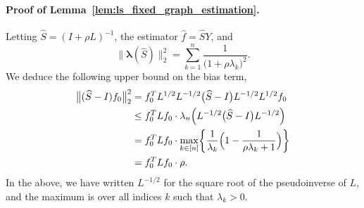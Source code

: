 \documentclass[twoside]{article}
\newcommand{\1}{\mathbf{1}}
\newcommand{\lambdavec}{\boldsymbol{\lambda}}
\newcommand{\Lap}{L}
\newcommand{\Id}{I}
\newcommand{\wh}[1]{\widehat{#1}}
\theoremstyle{definition}
\theoremstyle{remark}
\begin{document}
\paragraph{Proof of Lemma~\ref{lem:ls_fixed_graph_estimation}.}
Letting $\wh{S} = (\Id + \rho \Lap)^{-1}$, the estimator $\wh{f} = \wh{S}Y$, and
\begin{equation*}
\bigl\|\lambdavec(\wh{S})\bigr\|_2^2 = \sum_{k = 1}^{n} \frac{1}{\bigl(1 + \rho \lambda_k\bigr)^2}.
\end{equation*} 
We deduce the following upper bound on the bias term,
\begin{equation*}
\begin{aligned}
\bigl\|(\wh{S} - I)f_0\bigr\|_2^2 & = f_0^T \Lap^{1/2} \Lap^{-1/2}\bigl(\wh{S} - \Id\bigr) \Lap^{-1/2} \Lap^{1/2} f_0 \\
& \leq f_0^T \Lap f_0 \cdot \lambda_n\Bigl(\Lap^{-1/2}\bigl(\wh{S} - \Id\bigr)\Lap^{-1/2}\Bigr) \\
& = f_0^T \Lap f_0 \cdot \max_{k \in [n]} \biggl\{\frac{1}{\lambda_k} \Bigl(1 - \frac{1}{\rho\lambda_k + 1}\Bigr) \biggr\} \\
& = f_0^T \Lap f_0 \cdot \rho.
\end{aligned}
\end{equation*} 
In the above, we have written $\Lap^{-1/2}$ for the square root of the pseudoinverse of $\Lap$, and the maximum is over all indices $k$ such that $\lambda_k > 0$.
\end{document}
